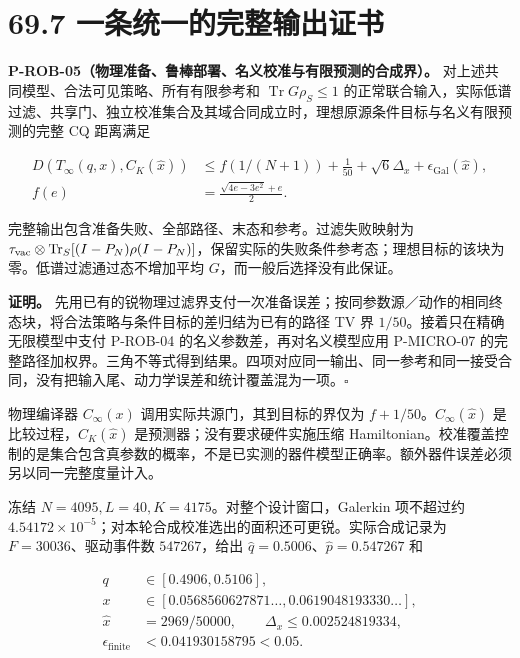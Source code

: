 \documentclass[
  11pt,
  oneside]{book}
\begin{document}
\section{69.7 一条统一的完整输出证书}

\protect\hypertarget{p-rob-05}{}{}

\textbf{P-ROB-05（物理准备、鲁棒部署、名义校准与有限预测的合成界）。}
对上述共同模型、合法可见策略、所有有限参考和
\(\operatorname{Tr}G\rho_S\le1\)
的正常联合输入，实际低谱过滤、共享门、独立校准集合及其域合同成立时，理想原源条件目标与名义有限预测的完整
CQ 距离满足

\[
\begin{aligned}
D(T_\infty(q,x),C_K(\widehat x))
&\le f(1/(N+1))+\frac1{50}+\sqrt6\Delta_x
       +\epsilon_{\mathrm{Gal}}(\widehat x),\\
f(e)&=\frac{\sqrt{4e-3e^2}+e}{2}.
\end{aligned}
\]

完整输出包含准备失败、全部路径、末态和参考。过滤失败映射为
\(\tau_{\rm vac}\otimes\operatorname{Tr}_S[(I-P_N)\rho(I-P_N)]\)，保留实际的失败条件参考态；理想目标的该块为零。低谱过滤通过态不增加平均
\(G\)，而一般后选择没有此保证。

\textbf{证明。}
先用已有的锐物理过滤界支付一次准备误差；按同参数源／动作的相同终态块，将合法策略与条件目标的差归结为已有的路径
TV 界 \(1/50\)。接着只在精确无限模型中支付 P-ROB-04
的名义参数差，再对名义模型应用 P-MICRO-07
的完整路径加权界。三角不等式得到结果。四项对应同一输出、同一参考和同一接受合同，没有把输入尾、动力学误差和统计覆盖混为一项。\(\square\)

物理编译器 \(C_\infty(x)\) 调用实际共源门，其到目标的界仅为
\(f+1/50\)。\(C_\infty(\widehat x)\) 是比较过程，\(C_K(\widehat x)\)
是预测器；没有要求硬件实施压缩
Hamiltonian。校准覆盖控制的是集合包含真参数的概率，不是已实测的器件模型正确率。额外器件误差必须另以同一完整度量计入。

冻结 \(N=4095,L=40,K=4175\)。对整个设计窗口，Galerkin 项不超过约
\(4.54172\times10^{-5}\)；对本轮合成校准选出的面积还可更锐。实际合成记录为
\(F=30036\)、驱动事件数 \(547267\)，给出
\(\widehat q=0.5006\)、\(\widehat p=0.547267\) 和

\[
\begin{aligned}
q&\in[0.4906,0.5106],\\
x&\in[0.0568560627871\ldots,0.0619048193330\ldots],\\
\widehat x&=2969/50000,\qquad
\Delta_x\le0.002524819334,\\
\epsilon_{\mathrm{finite}}&<0.041930158795<0.05.
\end{aligned}
\]
\end{document}
